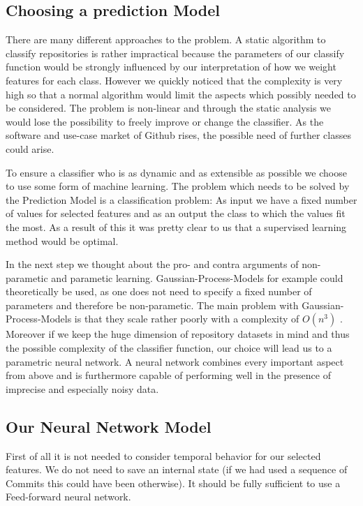 \documentclass[paper=A4,pagesize=auto,12pt,headinclude=true,footinclude=true,BCOR=0mm,DIV=calc]{scrartcl}
\begin{document}
	\subsection{Choosing a prediction Model}
	There are many different approaches to the problem. A static algorithm to classify repositories is rather impractical because the parameters of our classify function would be strongly influenced by our interpretation of how we weight features for each class. However we quickly noticed that the complexity is very high so that a normal algorithm would limit the aspects which possibly needed to be considered. The problem is non-linear and through the static analysis we would lose the possibility to freely improve or change the classifier. As the software and use-case market of Github rises, the possible need of further classes could arise.
	
	To ensure a classifier who is as dynamic and as extensible as possible we choose to use some form of machine learning.
	The problem which needs to be solved by the Prediction Model is a classification problem: As input we have a fixed number of values for selected features  and as an output the class to which the values fit the most. As a result of this it was pretty clear to us that a supervised learning method would be optimal.
	
	In the next step we thought about the pro- and contra arguments of non-parametic and parametic learning.
	Gaussian-Process-Models for example could theoretically be used, as one does not need to specify a fixed number of parameters and therefore be non-parametic. 
	The main problem with Gaussian-Process-Models is that they scale rather poorly with a complexity of $O(n^{3})$ \cite{DukeUniversity}. Moreover if we keep the huge dimension of repository datasets in mind and thus the possible complexity of the classifier function, our choice will lead us to a parametric neural network. A neural network combines every important aspect from above and is furthermore capable of performing well in the presence of imprecise and especially noisy data.
	
	\subsection{Our Neural Network Model}
	First of all it is not needed to consider temporal behavior for our selected features. We do not need to save an internal state (if we had used a sequence of Commits this could have been otherwise). It should be fully sufficient to use a Feed-forward neural network.
	
\end{document}
